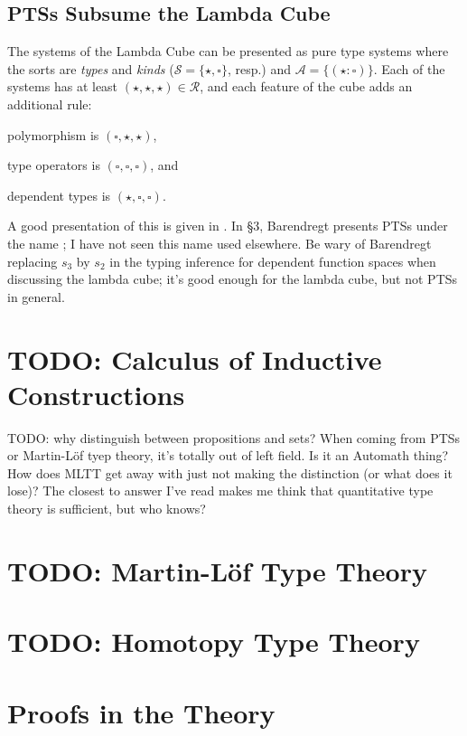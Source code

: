 \documentclass[11pt]{article} %
\theoremstyle{definition}
\theoremstyle{remark}
\begin{document}
\subsection{PTSs Subsume the Lambda Cube}
The systems of the Lambda Cube can be presented as pure type systems where the sorts are \textit{types} and \textit{kinds} ($\mathcal S = \{\star, \square\}$, resp.) and $\mathcal A = \{(\star : \square)\}$.
Each of the systems has at least $(\star, \star, \star) \in \mathcal R$, and each feature of the cube adds an additional rule:
\begin{enumerate*}[label=\textit{\roman*})]
\item polymorphism is $(\square,\star,\star)$,
\item type operators is $(\square,\square,\square)$, and
\item dependent types is $(\star,\square,\square)$.
\end{enumerate*}

A good presentation of this is given in \cite{barendregt_1991}.
In \S3, Barendregt presents PTSs under the name ; I have not seen this name used elsewhere.
Be wary of Barendregt replacing $s_3$ by $s_2$ in the typing inference for dependent function spaces when discussing the lambda cube; it's good enough for the lambda cube, but not PTSs in general.

\section{TODO: Calculus of Inductive Constructions}

TODO: why distinguish between propositions and sets? When coming from PTSs or Martin-L\"of tyep theory, it's totally out of left field. Is it an Automath thing? How does MLTT get away with just not making the distinction (or what does it lose)? The closest to answer I've read makes me think that quantitative type theory is sufficient, but who knows?

\section{TODO: Martin-L\"of Type Theory}
\section{TODO: Homotopy Type Theory}

\section{Proofs in the Theory}
\end{document}
